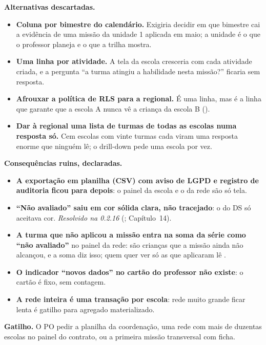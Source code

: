 \textbf{Alternativas descartadas.}

\begin{itemize}
  \item \textbf{Coluna por bimestre do calendário.} Exigiria decidir em que
    bimestre cai a evidência de uma missão da unidade 1 aplicada em maio; a
    unidade é o que o professor planeja e o que a trilha mostra.
  \item \textbf{Uma linha por atividade.} A tela da escola cresceria com cada
    atividade criada, e a pergunta \enquote{a turma atingiu a habilidade nesta
    missão?} ficaria sem resposta.
  \item \textbf{Afrouxar a política de RLS para a regional.} É uma linha, mas é
    a linha que garante que a escola A nunca vê a criança da escola B
    ().
  \item \textbf{Dar à regional uma lista de turmas de todas as escolas numa
    resposta só.} Cem escolas com vinte turmas cada viram uma resposta enorme
    que ninguém lê; o drill-down pede uma escola por vez.
\end{itemize}

\textbf{Consequências ruins, declaradas.}

\begin{itemize}
  \item \textbf{A exportação em planilha (CSV) com aviso de LGPD e registro de
    auditoria ficou para depois}: o painel da escola e o da rede são só tela.
  \item \textbf{\enquote{Não avaliado} saiu em cor sólida clara, não
    tracejado}: o  do DS só aceitava cor. \emph{Resolvido
    na 0.2.16} (; Capítulo~14).
  \item \textbf{A turma que não aplicou a missão entra na soma da série como
    \enquote{não avaliado}} no painel da rede: são crianças que a missão ainda
    não alcançou, e a soma diz isso; quem quer ver só as que aplicaram lê
    .
  \item \textbf{O indicador \enquote{novos dados} no cartão do professor não
    existe}: o cartão é fixo, sem contagem.
  \item \textbf{A rede inteira é uma transação por escola}: rede muito grande
    ficar lenta é gatilho para agregado materializado.
\end{itemize}

\textbf{Gatilho.} O PO pedir a planilha da coordenação, uma rede com mais de
duzentas escolas no painel do contrato, ou a primeira missão transversal com
ficha.

